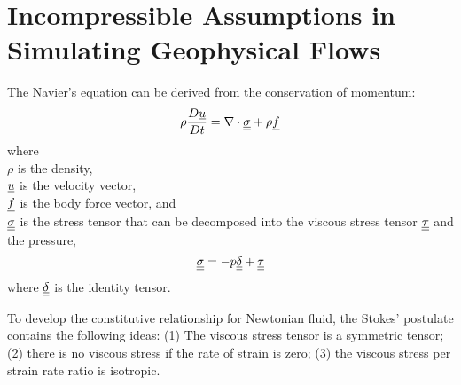 \normalsize
\section{Incompressible Assumptions in Simulating Geophysical Flows}

The Navier's equation \cite{Wilcox2003} can be derived from the conservation of momentum:
\begin{equation}
\rho \frac{D \underline u}{D t}=\nabla \cdot \underline{\underline\sigma} + \rho \underline f
\end{equation}
where \\
$\rho$ is the density, \\
$\underline u $ is the velocity vector, \\
$\underline f $ is the body force vector, and \\
$\underline{\underline\sigma} $ is the stress tensor that can be decomposed into the viscous stress tensor $\underline{\underline\tau} $ and the pressure, \\
\begin{equation}
\underline{\underline\sigma} = -p \underline{\underline\delta} + \underline{\underline\tau}
\end{equation}
where $\underline{\underline\delta}$ is the identity tensor.

To develop the constitutive relationship for Newtonian fluid, the Stokes' postulate \cite{Stokes1845,Batchelor1967,Panton1996,White1991} contains the following ideas: (1) The viscous stress tensor is a symmetric tensor; (2) there is no viscous stress if the rate of strain is zero; (3) the viscous stress per strain rate ratio is isotropic.

